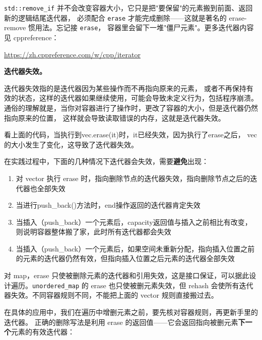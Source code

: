 \begin{note}
\texttt{std::remove\_if} 并不会改变容器大小，它只是把"要保留"的元素搬到前面、返回新的逻辑结尾迭代器，
必须配合 \texttt{erase} 才能完成删除——这就是著名的 erase-remove 惯用法。忘记接 \texttt{erase}，
容器里会留下一堆"僵尸元素"。更多迭代器内容见 cppreference：

\url{https://zh.cppreference.com/w/cpp/iterator}
\end{note}

\textbf{迭代器失效。}

迭代器失效指的是迭代器因为某些操作而不再指向原来的元素，
或者不再保持有效的状态，这样的迭代器如果继续使用，可能会导致未定义行为，包括程序崩溃。
通俗的理解就是，当你对容器进行了操作时，更改了容器的大小，但是迭代器仍然指向原来的位置，
这样就会导致读取错误的内存，这就是迭代器失效。


看上面的代码，当执行到vec.erase(it)时，it已经失效，因为执行了erase之后，
vec的大小发生了变化，这导致了迭代器失效。

在实践过程中，下面的几种情况下迭代器会失效，需要\textbf{避免}出现：
\begin{enumerate}
    \item 对 vector 执行 erase 时，指向删除节点的迭代器失效，指向删除节点之后的迭代器也全部失效
    \item 当进行push\_back()方法时，end操作返回的迭代器肯定失效
    \item 当插入（push\_back）一个元素后，capacity返回值与插入之前相比有改变，
    则说明容器整体搬了家，此时所有迭代器都会失效
    \item 当插入（push\_back）一个元素后，如果空间未重新分配，指向插入位置之前的元素的迭代器仍然有效，但指向插入位置之后元素的迭代器全部失效
\end{enumerate}

对 map，erase 只使被删除元素的迭代器和引用失效，这是接口保证，可以据此设计遍历。\texttt{unordered\_map} 的 erase 也只使被删元素失效，但 rehash 会使所有迭代器失效。不同容器规则不同，不能把上面的 vector 规则直接搬过去。

在具体的应用中，我们在遍历中增删元素之前，要先核对容器规则，再更新手里的迭代器。
正确的删除写法是利用 erase 的返回值——它会返回指向被删元素\textbf{下一个}元素的有效迭代器：

